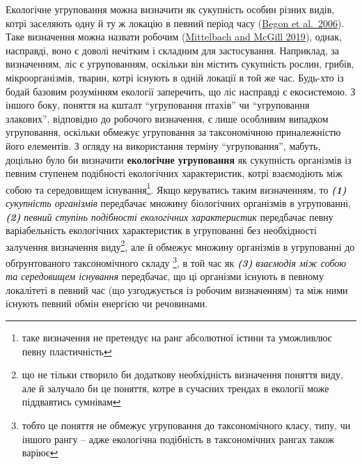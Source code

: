 \documentclass[
  11pt,
]{book}
\begin{document}
Екологічне угруповання можна визначити як сукупність особин різних
видів, котрі заселяють одну й ту ж локацію в певний період часу
(\href{https://scholar.google.com/scholar_lookup?title=Ecology\%3A\%20From\%20Individuals\%20to\%20Ecosystems&author=\%20&author=\%20&author=\%20&publication_year=2006&book=Ecology\%3A\%20From\%20Individuals\%20to\%20Ecosystems}{Begon
et al.~2006}). Таке визначення можна назвати робочим
(\href{https://doi.org/10.1093/oso/9780198835851.001.0001}{Mittelbach
and McGill 2019}), однак, насправді, воно є доволі нечітким і складним
для застосування. Наприклад, за визначенням, ліс є угрупованням,
оскільки він містить сукупність рослин, грибів, мікроорганізмів, тварин,
котрі існують в одній локації в той же час. Будь-хто із бодай базовим
розумінням екології заперечить, що ліс насправді є екосистемою. З іншого
боку, поняття на кшталт ``угруповання птахів'' чи ``угруповання
злакових'', відповідно до робочого визначення, є лише особливим випадком
угруповання, оскільки обмежує угруповання за таксономічною приналежністю
його елементів. З огляду на використання терміну ``угруповання'',
мабуть, доцільно було би визначити \textbf{екологічне угруповання} як
сукупність організмів із певним ступенем подібності екологічних
характеристик, котрі взаємодіють між собою та середовищем
існування\footnote{таке визначення не претендує на ранг абсолютної
  істини та уможливлює певну пластичність}. Якщо керуватись таким
визначенням, то \textbf{\emph{(1)}} \emph{сукупність організмів}
передбачає множину біологічних організмів в угрупованні,
\textbf{\emph{(2)}} \emph{певний ступінь подібності екологічних
характеристик} передбачає певну варіабельність екологічних характеристик
в угрупованні без необхідності залучення визначення виду\footnote{що не
  тільки створило би додаткову необхідність визначення поняття виду, але
  й залучало би це поняття, котре в сучасних трендах в екології може
  піддвавтись сумнівам}, але й обмежує множину організмів в угрупованні
до обґрунтованого таксономічного складу \footnote{тобто це поняття не
  обмежує угруповання до таксономічного класу, типу, чи іншого рангу --
  адже екологічна подібність в таксономічних рангах також варіює}, в той
час як \textbf{\emph{(3)}} \emph{взаємодія між собою та середовищем
існування} передбачає, що ці організми існують в певному локалітеті в
певний час (що узгоджується із робочим визначенням) та між ними існують
певний обмін енергією чи речовинами.
\end{document}
